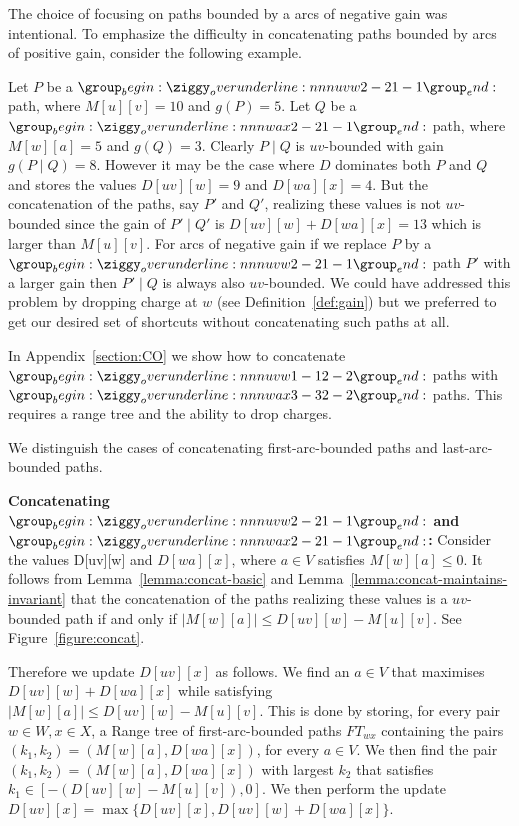 \documentclass[11pt]{article}
\begin{document}
The choice of focusing on  paths  bounded by a arcs of negative gain  was intentional. To emphasize the difficulty in concatenating   paths  bounded by arcs of positive gain, consider the following example.

Let $P$ be a $\overunderline{uvw}{2-2}{1-1}$ path, where $M[u][v] = 10$ and $g(P)=5$. Let $Q$ be a $\overunderline{wax}{2-2}{1-1}$ path, where $M[w][a] = 5$ and $g(Q)=3$. Clearly $P\mid Q$ is $uv$-bounded with gain $g(P\mid Q)=8$.
However it may be the case where $D$
 dominates both $P$ and $Q$ and stores the values $D[uv][w]=9$ and $D[wa][x]=4$.
 But the concatenation of the paths, say $P'$ and $Q'$, realizing these values is not $uv$-bounded since the gain of $P'\mid Q'$ is
  $D[uv][w] + D[wa][x]=13$ which is larger than $M[u][v]$. For arcs of negative gain  if we replace $P$ by a $\overunderline{uvw}{2-2}{1-1}$ path $P'$ with a larger gain then $P'\mid Q$ is always also 
  $uv$-bounded. We could have addressed this problem by dropping charge at $w$ (see Definition~\ref{def:gain}) but we preferred to  get our desired set of shortcuts without concatenating such paths at all.

    
In Appendix~\ref{section:CO} we show how to concatenate  $\overunderline{uvw}{1-1}{2-2}$ paths with  $\overunderline{wax}{3-3}{2-2}$ paths. 
This requires a range tree and the ability to drop charges.

We distinguish the cases of concatenating first-arc-bounded paths and last-arc-bounded paths.

\textbf{Concatenating $\overunderline{uvw}{2-2}{1-1}$ and $\overunderline{wax}{2-2}{1-1}$:}
Consider the values D[uv][w] and $D[wa][x]$, where $a\in V$ satisfies $ M[w][a]\le 0$.
It follows from Lemma~\ref{lemma:concat-basic} and Lemma~\ref{lemma:concat-maintains-invariant} that
the concatenation of the paths realizing these values is 
a $uv$-bounded path if and only if
$|M[w][a]| \le D[uv][w] - M[u][v]$. See Figure~\ref{figure:concat}.

Therefore we update $D[uv][x]$ as follows. 
 We find an $a\in V$ that maximises $D[uv][w] + D[wa][x]$ while satisfying $|M[w][a]| \le D[uv][w] - M[u][v]$. This is done by storing, for every pair $w\in W, x\in X$, a Range tree of first-arc-bounded paths $FT_{wx}$ containing the pairs $(k_1,k_2)=(M[w][a], D[wa][x])$, for every $a\in V$. We then find the pair $(k_1,k_2)=(M[w][a], D[wa][x])$ with largest $k_2$ that satisfies $k_1 \in [-( D[uv][w] - M[u][v]),0]$. We then perform the update $D[uv][x] = \max \{ D[uv][x], D[uv][w] + D[wa][x]\}$.
\end{document}
